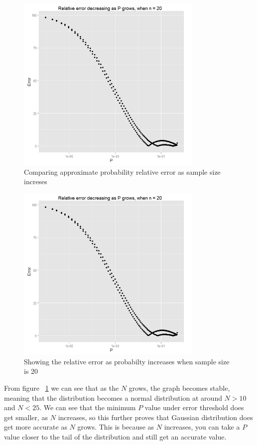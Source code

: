 \documentclass[12pt]{article}
\begin{document}
\begin{figure}[!h]
	\centering
  \includegraphics[width=0.8\textwidth]{RelativeErrorDecreasingPgrowsN20}
	\caption{Comparing approximate probability relative error as sample size increses}
	\label{fig:PvsN}
\end{figure}

\begin{figure}[!h]
	\centering
  \includegraphics[width=0.8\textwidth]{RelativeErrorDecreasingPgrowsN20}
	\caption{Showing the relative error as probabilty increases when sample size is 20}
	\label{fig:RelativeErrorDecresingPgrows}
\end{figure}

From figure ~\ref{fig:PvsN} we can see that as the $N$ grows, the graph becomes stable, meaning that the distribution becomes a normal distribution at around $N > 10$ and $N < 25$. We can see that the minimum $P$ value under error threshold does get smaller, as $N$ increases, so this further proves that Gaussian distribution does get more accurate as $N$ grows. This is because as $N$ increases, you can take a $P$ value closer to the tail of the distribution and still get an accurate value.
\end{document}
